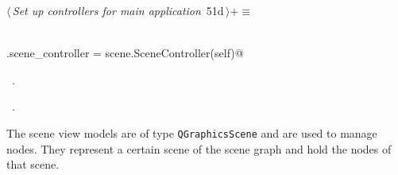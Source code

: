 \documentclass[
    a4paper,      %
    10pt,         %
    openright,    %
    notitlepage,  %
    parskip=half, %
]{scrreprt}       %
\theoremstyle{definition}                    %
\begin{document}
\begin{flushleft} \small
\begin{minipage}{\linewidth}\label{scrap79}\raggedright\small
{} $\langle\,${\itshape Set up controllers for main application}\nobreak\ {\footnotesize {51d}}$\,\rangle+\equiv$
\vspace{-1ex}
\begin{list}{}{} \item
\mbox{}\lstinline@@\\
\mbox{}\lstinline@self.scene_controller = scene.SceneController(self)@{\NWsep}
\end{list}
\vspace{-1.5ex}
\footnotesize
\begin{list}{}{\setlength{\itemsep}{-\parsep}\setlength{\itemindent}{-\leftmargin}}
\item \NWtxtMacroDefBy\ .
\item \NWtxtMacroRefIn\ .

\item{}
\end{list}
\end{minipage}\vspace{4ex}
\end{flushleft}
The scene view models are of type \verb+QGraphicsScene+ and are used to manage
nodes. They represent a certain scene of the scene graph and hold the nodes of
that scene.
\end{document}
